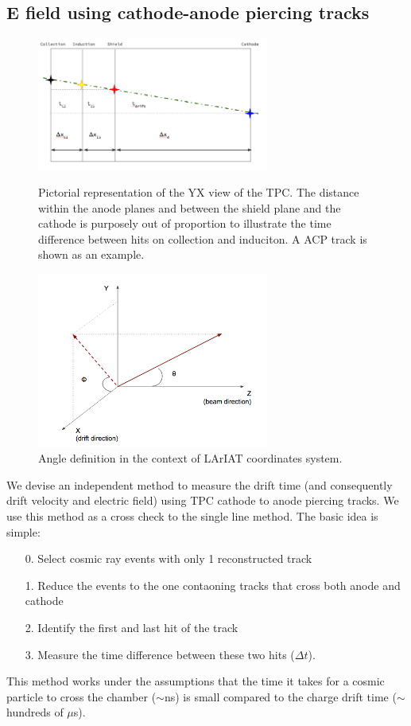 \subsection*{E field using cathode-anode piercing tracks}
\begin{figure}[b]
\centering
\begin{minipage}{0.45\textwidth}
\centering
\includegraphics[width=3in]{AppendixB-EField/Images/TPCCrossSectionView.png}
\caption{Pictorial representation of the YX view of the TPC. The distance within the anode planes and between the shield plane and the cathode is purposely out of proportion to illustrate the time difference between hits on collection and induciton. A ACP track is shown as an example.}
\label{fig:Scheme}
\end{minipage}\hfill
\begin{minipage}{0.45\textwidth}
\centering
\includegraphics[width=3in]{AppendixB-EField/Images/AngleDef.png}
\caption{Angle definition in the context of LArIAT coordinates system.}
\label{fig:AngleDef}
\end{minipage}
\end{figure}
We devise an independent method to measure the drift time (and consequently drift velocity and electric field) using TPC cathode to anode piercing tracks. We use this method as a cross check to the single line method.
The basic idea is simple:
\begin{itemize}
\item[0.] Select cosmic ray events with only 1 reconstructed track 
\item[1.] Reduce the events to the one contaoning tracks that cross both anode and cathode
\item[2.] Identify the first and last hit of the track
\item[3.] Measure the time difference between these two hits ($\Delta t$).
\end{itemize}
This method works under the assumptions that the time it takes for a cosmic particle to cross the chamber ($\sim$ns) is small compared to the charge drift time ($\sim$ hundreds of $\mu$s).

